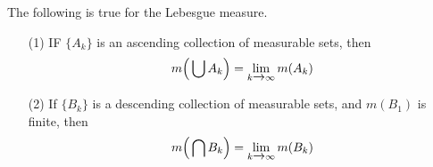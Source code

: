 \begin{theorem}\label{8.5.2}
    The following is true for the Lebesgue measure.
    \begin{enumerate}
        \item[(1)] IF $\{A_k\}$ is an ascending collection of measurable sets,
            then
            \begin{equation*}
                m\Big{(} \bigcup{A_k} \Big{)}=\lim_{k \xrightarrow{} \infty}{m(A_k)}
            \end{equation*}

        \item[(2)] If $\{B_k\}$ is a descending collection of measurable sets,
            and $m(B_1)$ is finite, then
            \begin{equation*}
                m\Big{(} \bigcap{B_k} \Big{)}=\lim_{k \xrightarrow{} \infty}{m(B_k)}
            \end{equation*}
    \end{enumerate}
\end{theorem}
